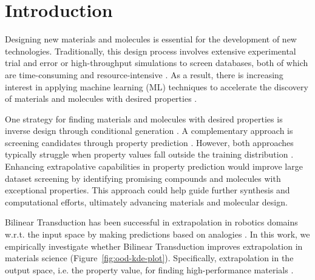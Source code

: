 \section{Introduction}\label{sec1}

Designing new materials and molecules is essential for the development of new technologies. Traditionally, this design process involves extensive experimental trial and error or high-throughput simulations to screen databases, both of which are time-consuming and resource-intensive \cite{axelrod2022learning, sanchez2018inverse}. As a result, there is increasing interest in applying machine learning (ML) techniques to accelerate the discovery of materials and molecules with desired properties \cite{axelrod2022learning, sanchez2018inverse, bilodeau2022generative, noh2020machine, kim2021deep}.

One strategy for finding materials and molecules with desired properties is inverse design through conditional generation \cite{noh2020machine, kim2021deep, zeni2023mattergen, yang2023scalable, xie2021crystal, sanchez2018inverse}.
A complementary approach is screening candidates through property prediction \cite{walters2020applications, dunn2020benchmarking, wang2021compositionally, zhuo2018predicting, de2021materials, ward2016general}. 
However, both approaches typically struggle when property values fall outside the training distribution \cite{noh2020machine,wang2021compositionally,de2021materials, kauwe2020can, zhao2022limitations, omee2024structure} . Enhancing extrapolative capabilities in property prediction would improve large dataset screening by identifying promising compounds and molecules with exceptional properties. This approach could help guide further synthesis and computational efforts, ultimately advancing materials and molecular design.

Bilinear Transduction \cite{netanyahu2023transduction} has been successful in extrapolation in robotics domains w.r.t. the input space by making predictions based on analogies . 
% 
In this work, we empirically investigate whether Bilinear Transduction improves extrapolation in materials science (Figure~\ref{fig:ood-kde-plot}).
Specifically, extrapolation in the output space, i.e. the property value, for finding high-performance materials .


